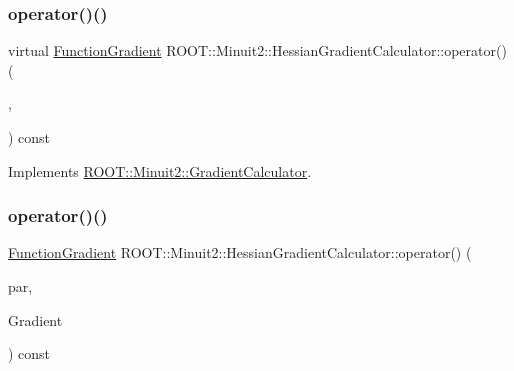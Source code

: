\mbox{\label{classROOT_1_1Minuit2_1_1HessianGradientCalculator_af6fed0f29a33ec23f97451562d41cfaa}} 
\subsubsection{\texorpdfstring{operator()()}{operator()()}\hspace{0.1cm}{\footnotesize\ttfamily [4/6]}}
{\footnotesize\ttfamily virtual \mbox{\hyperlink{classROOT_1_1Minuit2_1_1FunctionGradient}{Function\+Gradient}} R\+O\+O\+T\+::\+Minuit2\+::\+Hessian\+Gradient\+Calculator\+::operator() (\begin{DoxyParamCaption}\item[{const \mbox{\hyperlink{classROOT_1_1Minuit2_1_1MinimumParameters}{Minimum\+Parameters}} \&}]{,  }\item[{const \mbox{\hyperlink{classROOT_1_1Minuit2_1_1FunctionGradient}{Function\+Gradient}} \&}]{ }\end{DoxyParamCaption}) const\hspace{0.3cm}{\ttfamily [virtual]}}



Implements \mbox{\hyperlink{classROOT_1_1Minuit2_1_1GradientCalculator_a1809c1e8a89d32aabf7835e9690c2916}{R\+O\+O\+T\+::\+Minuit2\+::\+Gradient\+Calculator}}.

\mbox{\label{classROOT_1_1Minuit2_1_1HessianGradientCalculator_ae8832c265494484c65aed77f023b843f}} 
\subsubsection{\texorpdfstring{operator()()}{operator()()}\hspace{0.1cm}{\footnotesize\ttfamily [5/6]}}
{\footnotesize\ttfamily \mbox{\hyperlink{classROOT_1_1Minuit2_1_1FunctionGradient}{Function\+Gradient}} R\+O\+O\+T\+::\+Minuit2\+::\+Hessian\+Gradient\+Calculator\+::operator() (\begin{DoxyParamCaption}\item[{const \mbox{\hyperlink{classROOT_1_1Minuit2_1_1MinimumParameters}{Minimum\+Parameters}} \&}]{par,  }\item[{const \mbox{\hyperlink{classROOT_1_1Minuit2_1_1FunctionGradient}{Function\+Gradient}} \&}]{Gradient }\end{DoxyParamCaption}) const\hspace{0.3cm}{\ttfamily [virtual]}}



